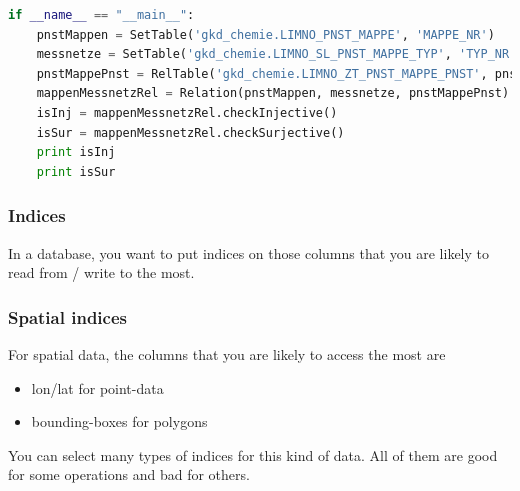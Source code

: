 \begin{lstlisting}[language=python]
if __name__ == "__main__":
    pnstMappen = SetTable('gkd_chemie.LIMNO_PNST_MAPPE', 'MAPPE_NR')
    messnetze = SetTable('gkd_chemie.LIMNO_SL_PNST_MAPPE_TYP', 'TYP_NR')
    pnstMappePnst = RelTable('gkd_chemie.LIMNO_ZT_PNST_MAPPE_PNST', pnstMappen, 'MAPPE_NR', messnetze, 'MN_NR')
    mappenMessnetzRel = Relation(pnstMappen, messnetze, pnstMappePnst)
    isInj = mappenMessnetzRel.checkInjective()
    isSur = mappenMessnetzRel.checkSurjective()
    print isInj
    print isSur

\end{lstlisting}


\subsubsection{Indices}
In a database, you want to put indices on those columns that you are likely to read from / write to the most. 

\subsubsection{Spatial indices}
For spatial data, the columns that you are likely to access the most are 
\begin{itemize}
    \item lon/lat for point-data
    \item bounding-boxes for polygons
\end{itemize}
You can select many types of indices for this kind of data. All of them are good for some operations and bad for others. 

